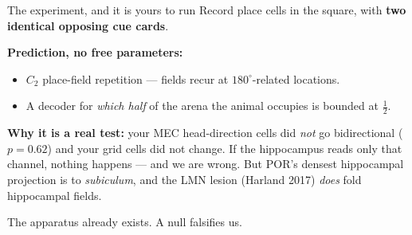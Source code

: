 \documentclass[9pt,aspectratio=169]{beamer}
\begin{document}
\begin{frame}{The experiment, and it is yours to run}
\vspace{10pt}
\centering
\Large
Record place cells in the square, with \textbf{two identical opposing cue cards}.

\vspace{16pt}
\normalsize
\raggedright
\textbf{Prediction, no free parameters:}
\begin{itemize}
\item $C_2$ place-field repetition --- fields recur at $180^\circ$-related locations.
\item A decoder for \emph{which half} of the arena the animal occupies is bounded at
$\tfrac{1}{2}$.
\end{itemize}

\vspace{10pt}
\textbf{Why it is a real test:} your MEC head-direction cells did \emph{not} go bidirectional
($p=0.62$) and your grid cells did not change. If the hippocampus reads only that channel, nothing
happens --- and we are wrong. But POR's densest hippocampal projection is to \emph{subiculum}, and
the LMN lesion (Harland 2017) \emph{does} fold hippocampal fields.

\vspace{10pt}
\alert{The apparatus already exists. A null falsifies us.}
\end{frame}
\end{document}
